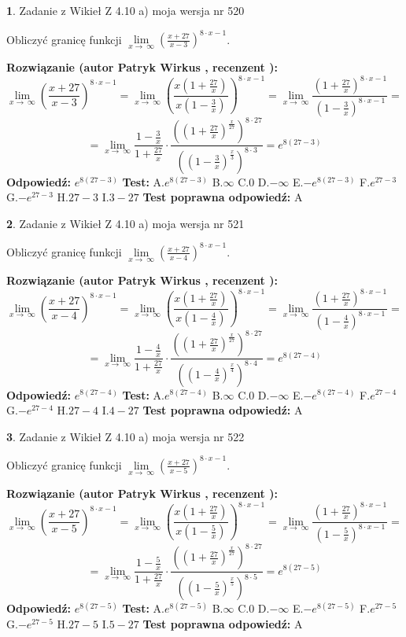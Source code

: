 \documentclass[12pt, a4paper]{article}
\theoremstyle{definition} %
\newtheorem{zad}{}
\newcommand{\zadStart}[1]{\begin{zad}#1\newline}
\newcommand{\zadStop}{\end{zad}}
\newcommand{\rozwStart}[2]{\noindent \textbf{Rozwiązanie (autor #1 , recenzent #2): }\newline}
\newcommand{\rozwStop}{\newline}
\newcommand{\odpStart}{\noindent \textbf{Odpowiedź:}\newline}
\newcommand{\odpStop}{\newline}
\newcommand{\testStart}{\noindent \textbf{Test:}\newline}
\newcommand{\testStop}{\newline}
\newcommand{\kluczStart}{\noindent \textbf{Test poprawna odpowiedź:}\newline}
\newcommand{\kluczStop}{\newline}
\begin{document}
\zadStart{Zadanie z Wikieł Z 4.10 a) moja wersja nr 520}


Obliczyć granicę funkcji  $\lim\limits_{x\to\ \infty}(\frac{x+27}{x-3})^{8\cdot x-1}$.
\zadStop
\rozwStart{Patryk Wirkus}{}
$$\lim\limits_{x\to\ \infty}(\frac{x+27}{x-3})^{8\cdot x-1} = \lim\limits_{x\to\ \infty}(\frac{x(1+\frac{27}{x})}{x(1-\frac{3}{x})})^{8\cdot x-1}=\lim\limits_{x\to\ \infty}\frac{(1+\frac{27}{x})^{8\cdot x-1}}{(1-\frac{3}{x})^{8\cdot x-1}}=$$
$$=\lim\limits_{x\to\ \infty}\frac{1-\frac{3}{x}}{1+\frac{27}{x}}\cdot\frac{((1+\frac{27}{x})^{\frac{x}{27}})^{8\cdot27}}{((1-\frac{3}{x})^{\frac{x}{3}})^{8\cdot3}}=e^{8(27-3)}$$
\rozwStop
\odpStart
$e^{8(27-3)}$
\odpStop
\testStart
A.$e^{8(27-3)}$ B.$\infty$ C.$0$ D.$-\infty$ E.$-e^{8(27-3)}$
F.$e^{27-3}$ G.$-e^{27-3}$
H.$27-3$
I.$3-27$
\testStop
\kluczStart
A
\kluczStop



\zadStart{Zadanie z Wikieł Z 4.10 a) moja wersja nr 521}


Obliczyć granicę funkcji  $\lim\limits_{x\to\ \infty}(\frac{x+27}{x-4})^{8\cdot x-1}$.
\zadStop
\rozwStart{Patryk Wirkus}{}
$$\lim\limits_{x\to\ \infty}(\frac{x+27}{x-4})^{8\cdot x-1} = \lim\limits_{x\to\ \infty}(\frac{x(1+\frac{27}{x})}{x(1-\frac{4}{x})})^{8\cdot x-1}=\lim\limits_{x\to\ \infty}\frac{(1+\frac{27}{x})^{8\cdot x-1}}{(1-\frac{4}{x})^{8\cdot x-1}}=$$
$$=\lim\limits_{x\to\ \infty}\frac{1-\frac{4}{x}}{1+\frac{27}{x}}\cdot\frac{((1+\frac{27}{x})^{\frac{x}{27}})^{8\cdot27}}{((1-\frac{4}{x})^{\frac{x}{4}})^{8\cdot4}}=e^{8(27-4)}$$
\rozwStop
\odpStart
$e^{8(27-4)}$
\odpStop
\testStart
A.$e^{8(27-4)}$ B.$\infty$ C.$0$ D.$-\infty$ E.$-e^{8(27-4)}$
F.$e^{27-4}$ G.$-e^{27-4}$
H.$27-4$
I.$4-27$
\testStop
\kluczStart
A
\kluczStop



\zadStart{Zadanie z Wikieł Z 4.10 a) moja wersja nr 522}


Obliczyć granicę funkcji  $\lim\limits_{x\to\ \infty}(\frac{x+27}{x-5})^{8\cdot x-1}$.
\zadStop
\rozwStart{Patryk Wirkus}{}
$$\lim\limits_{x\to\ \infty}(\frac{x+27}{x-5})^{8\cdot x-1} = \lim\limits_{x\to\ \infty}(\frac{x(1+\frac{27}{x})}{x(1-\frac{5}{x})})^{8\cdot x-1}=\lim\limits_{x\to\ \infty}\frac{(1+\frac{27}{x})^{8\cdot x-1}}{(1-\frac{5}{x})^{8\cdot x-1}}=$$
$$=\lim\limits_{x\to\ \infty}\frac{1-\frac{5}{x}}{1+\frac{27}{x}}\cdot\frac{((1+\frac{27}{x})^{\frac{x}{27}})^{8\cdot27}}{((1-\frac{5}{x})^{\frac{x}{5}})^{8\cdot5}}=e^{8(27-5)}$$
\rozwStop
\odpStart
$e^{8(27-5)}$
\odpStop
\testStart
A.$e^{8(27-5)}$ B.$\infty$ C.$0$ D.$-\infty$ E.$-e^{8(27-5)}$
F.$e^{27-5}$ G.$-e^{27-5}$
H.$27-5$
I.$5-27$
\testStop
\kluczStart
A
\kluczStop
\end{document}
